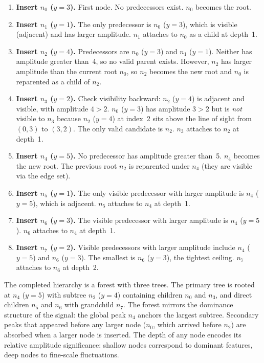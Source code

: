 \documentclass[a4paper,12pt]{article}
\begin{document}
\begin{enumerate}[leftmargin=2em, itemsep=0.4em]
    \item \textbf{Insert $n_0$ ($y{=}3$).} First node. No predecessors exist. $n_0$ becomes the root.

    \item \textbf{Insert $n_1$ ($y{=}1$).} The only predecessor is $n_0$ ($y{=}3$), which is visible (adjacent) and has larger amplitude. $n_1$ attaches to $n_0$ as a child at depth~1.

    \item \textbf{Insert $n_2$ ($y{=}4$).} Predecessors are $n_0$ ($y{=}3$) and $n_1$ ($y{=}1$). Neither has amplitude greater than~4, so no valid parent exists. However, $n_2$ has larger amplitude than the current root $n_0$, so $n_2$ becomes the new root and $n_0$ is reparented as a child of $n_2$.

    \item \textbf{Insert $n_3$ ($y{=}2$).} Check visibility backward: $n_2$ ($y{=}4$) is adjacent and visible, with amplitude $4 > 2$. $n_0$ ($y{=}3$) has amplitude $3 > 2$ but is \emph{not} visible to $n_3$ because $n_2$ ($y{=}4$) at index~2 sits above the line of sight from $(0, 3)$ to $(3, 2)$. The only valid candidate is $n_2$. $n_3$ attaches to $n_2$ at depth~1.

    \item \textbf{Insert $n_4$ ($y{=}5$).} No predecessor has amplitude greater than~5. $n_4$ becomes the new root. The previous root $n_2$ is reparented under $n_4$ (they are visible via the edge set).

    \item \textbf{Insert $n_5$ ($y{=}1$).} The only visible predecessor with larger amplitude is $n_4$ ($y{=}5$), which is adjacent. $n_5$ attaches to $n_4$ at depth~1.

    \item \textbf{Insert $n_6$ ($y{=}3$).} The visible predecessor with larger amplitude is $n_4$ ($y{=}5$). $n_6$ attaches to $n_4$ at depth~1.

    \item \textbf{Insert $n_7$ ($y{=}2$).} Visible predecessors with larger amplitude include $n_4$ ($y{=}5$) and $n_6$ ($y{=}3$). The smallest is $n_6$ ($y{=}3$), the tightest ceiling. $n_7$ attaches to $n_6$ at depth~2.
\end{enumerate}

The completed hierarchy is a forest with three trees. The primary tree is rooted at $n_4$ ($y{=}5$) with subtree $n_2$ ($y{=}4$) containing children $n_0$ and $n_3$, and direct children $n_5$ and $n_6$ with grandchild $n_7$. The forest mirrors the dominance structure of the signal: the global peak $n_4$ anchors the largest subtree. Secondary peaks that appeared before any larger node ($n_0$, which arrived before $n_2$) are absorbed when a larger node is inserted. The depth of any node encodes its relative amplitude significance: shallow nodes correspond to dominant features, deep nodes to fine-scale fluctuations.
\end{document}

